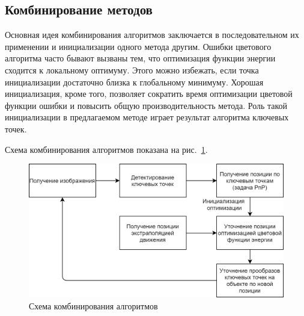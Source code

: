 
\subsection{Комбинирование методов}


Основная идея комбинирования алгоритмов заключается в последовательном их
применении и инициализации одного метода другим.
Ошибки цветового алгоритма часто бывают вызваны тем, что оптимизация функции
энергии сходится к локальному оптимуму.
Этого можно избежать, если точка инициализации достаточно близка к глобальному
минимуму.
Хорошая инициализация, кроме того, позволяет сократить время оптимизации
цветовой функции ошибки и повысить общую производительность метода.
Роль такой инициализации в предлагаемом методе играет результат алгоритма
ключевых точек.

\newcommand{\FeatAlg}{\ensuremath{F_{\text{\it feat}}}}
\newcommand{\ColorAlg}{\ensuremath{F_{\text {\it color}}}}
\newcommand{\PoseOnFrame}[1]{\ensuremath{\Pose^{\left( #1 \right)}}}
\newcommand{\PoseI}{\ensuremath{\PoseOnFrame{i}}}
\newcommand{\FeatPoseI}{\ensuremath{\PoseI_{\text {\it feat}}}}
\newcommand{\FeatPose}{\ensuremath{\Pose_{\text {\it feat}}}}

\newcommand{\XOld}{\ensuremath{\vect{x_{\text {\it old}}}}}
\newcommand{\XNew}{\ensuremath{\vect{x_{\text{\it new}}}}}
\newcommand{\ReprErr}[1]{\ensuremath{\vect{e}( #1 )}}

Схема комбинирования алгоритмов показана на рис.~\ref{fig:combining_schema}.

\begin{figure}[t]
\centering
\includegraphics[width=\textwidth]{fig/combining_schema.png}
\caption{
Схема комбинирования алгоритмов
} \label{fig:combining_schema}
\end{figure}


